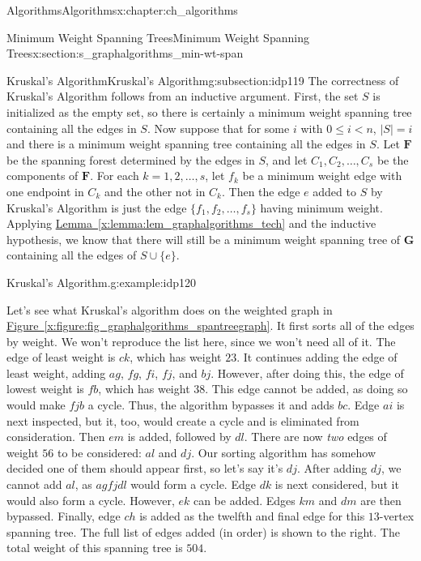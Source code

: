 \documentclass[oneside,10pt,]{book}
\newcommand{\xreffont}{\relax}
\numberwithin{equation}{section}
\newcommand{\bfG}{\mathbf{G}}
\newcommand{\bfF}{\mathbf{F}}
\newcommand{\lt}{<}
\begin{document}
\begin{chapterptx}{Algorithms}{}{Algorithms}{}{}{x:chapter:ch_algorithms}
\begin{sectionptx}{Minimum Weight Spanning Trees}{}{Minimum Weight Spanning Trees}{}{}{x:section:s_graphalgorithms_min-wt-span}
\begin{subsectionptx}{Kruskal's Algorithm}{}{Kruskal's Algorithm}{}{}{g:subsection:idp119}
The correctness of Kruskal's Algorithm follows from an inductive argument. First, the set \(S\) is initialized as the empty set, so there is certainly a minimum weight spanning tree containing all the edges in \(S\). Now suppose that for some \(i\) with \(0\le i \lt n\), \(|S|=i\) and there is a minimum weight spanning tree containing all the edges in \(S\). Let \(\bfF\) be the spanning forest determined by the edges in \(S\), and let \(C_1, C_2,\dots,C_s\) be the components of \(\bfF\). For each \(k=1,2,\dots,s\), let \(f_k\) be a minimum weight edge with one endpoint in \(C_k\) and the other not in \(C_k\). Then the edge \(e\) added to \(S\) by Kruskal's Algorithm is just the edge \(\{f_1,f_2,\dots,f_s\}\) having minimum weight. Applying \hyperref[x:lemma:lem_graphalgorithms_tech]{Lemma~{\xreffont\ref{x:lemma:lem_graphalgorithms_tech}}} and the inductive hypothesis, we know that there will still be a minimum weight spanning tree of \(\bfG\) containing all the edges of \(S\cup\{e\}\).%
\begin{example}{Kruskal's Algorithm.}{g:example:idp120}%
\begin{sidebyside}{2}{0.0125}{0.0125}{0.025}%
\begin{sbspanel}{0.78}%
Let's see what Kruskal's algorithm does on the weighted graph in \hyperref[x:figure:fig_graphalgorithms_spantreegraph]{Figure~{\xreffont\ref{x:figure:fig_graphalgorithms_spantreegraph}}}.  It first sorts all of the edges by weight. We won't reproduce the list here, since we won't need all of it. The edge of least weight is \(ck\), which has weight \(23\). It continues adding the edge of least weight, adding \(ag\), \(fg\), \(fi\), \(fj\), and \(bj\). However, after doing this, the edge of lowest weight is \(fb\), which has weight \(38\). This edge cannot be added, as doing so would make \(fjb\) a cycle. Thus, the algorithm bypasses it and adds \(bc\). Edge \(ai\) is next inspected, but it, too, would create a cycle and is eliminated from consideration. Then \(em\) is added, followed by \(dl\). There are now \emph{two} edges of weight \(56\) to be considered: \(al\) and \(dj\). Our sorting algorithm has somehow decided one of them should appear first, so let's say it's \(dj\). After adding \(dj\), we cannot add \(al\), as \(agfjdl\) would form a cycle. Edge \(dk\) is next considered, but it would also form a cycle. However, \(ek\) can be added. Edges \(km\) and \(dm\) are then bypassed. Finally, edge \(ch\) is added as the twelfth and final edge for this \(13\)-vertex spanning tree. The full list of edges added (in order) is shown to the right. The total weight of this spanning tree is \(504\).%

\end{sbspanel}
\end{sidebyside}
\end{example}
\end{subsectionptx}
\end{sectionptx}
\end{chapterptx}
\end{document}
